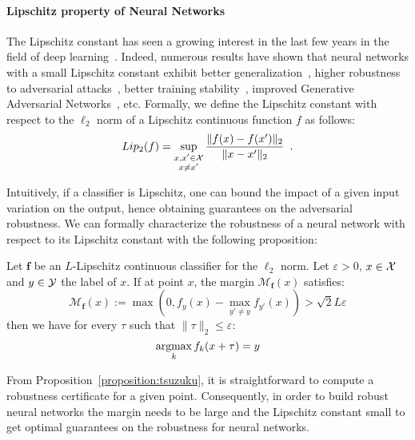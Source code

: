 \paragraph{Lipschitz property of Neural Networks} 
The Lipschitz constant has seen a growing interest in the last few years in the field of deep learning~\citep{scaman2018lipschitz,fazlyab2019efficient,combettes2020lipschitz,bethune2021many}.
Indeed, numerous results have shown that neural networks with a small Lipschitz constant exhibit better generalization~\citep{bartlett2017spectrally}, higher robustness to adversarial attacks~\citep{szegedy2014intriguing,farnia2018generalizable,tsuzuku2018lipschitz}, better training stability~\citep{xiao2018dynamical,trockman2021orthogonalizing}, improved Generative Adversarial Networks~\citep{arjovsky2017wasserstein}, etc.
Formally, we define the Lipschitz constant with respect to the $\ell_2$ norm of a Lipschitz continuous function $f$ as follows:
\begin{equation*}
  Lip_{2}{(f)} = \sup_{\substack{x, x' \in \mathcal{X} \\ x \neq x'}} \frac{\lVert f(x) - f(x') \rVert_2}{\lVert x - x' \rVert_2} \enspace.
\end{equation*}

Intuitively, if a classifier is Lipschitz, one can bound the impact of a given input variation on the output, hence obtaining guarantees on the adversarial robustness.
We can formally characterize the robustness of a neural network with respect to its Lipschitz constant with the following proposition:
\begin{prop} \label{proposition:tsuzuku}
Let $\mathbf{f}$ be an $L$-Lipschitz continuous classifier for the $\ell_2$ norm.
Let $\varepsilon > 0$, $x \in \mathcal{X}$ and $y \in \mathcal{Y}$ the label of $x$.
If at point $x$, the margin $\mathcal{M}_{\mathbf{f}}(x)$ satisfies:
\begin{equation*}
  \mathcal{M}_{\mathbf{f}}(x):=\max(0,f_y(x)-\max_{y'\neq y}f_{y'}(x)) > \sqrt{2} L \varepsilon
\end{equation*}
then we have for every $\tau$ such that $\lVert \tau \rVert_2 \leq \varepsilon$:
\begin{equation*}
  \operatorname*{argmax}_{k}f_k(x + \tau) = y
\end{equation*}
\end{prop}
From Proposition~\ref{proposition:tsuzuku}, it is straightforward to compute a robustness certificate for a given point.
Consequently, in order to build robust neural networks the margin needs to be large and the Lipschitz constant small to get optimal guarantees on the robustness for neural networks.


